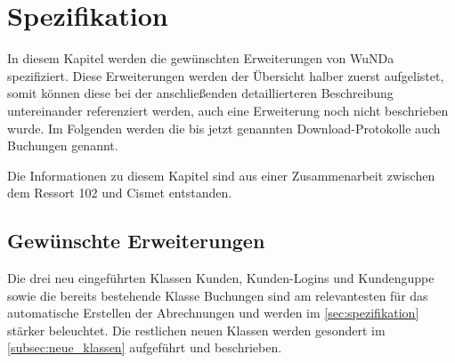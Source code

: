 \chapter{Spezifikation}
In diesem Kapitel werden die gewünschten Erweiterungen von \ac{WuNDa} spezifiziert.
Diese Erweiterungen werden der Übersicht halber zuerst aufgelistet, somit können diese bei der anschließenden detaillierteren Beschreibung untereinander referenziert werden, auch eine Erweiterung noch nicht beschrieben wurde.
Im Folgenden werden die bis jetzt genannten Download-Protokolle auch Buchungen genannt. 

Die Informationen zu diesem Kapitel sind aus einer Zusammenarbeit zwischen dem Ressort 102 und Cismet entstanden. 
\section{Gewünschte Erweiterungen}

Die drei neu eingeführten Klassen Kunden, Kunden-Logins und Kundenguppe sowie die bereits bestehende Klasse Buchungen sind am relevantesten für das automatische Erstellen der Abrechnungen und werden im \autoref{sec:spezifikation} stärker beleuchtet. 
Die restlichen neuen Klassen werden gesondert im \autoref{subsec:neue_klassen} aufgeführt und beschrieben.


